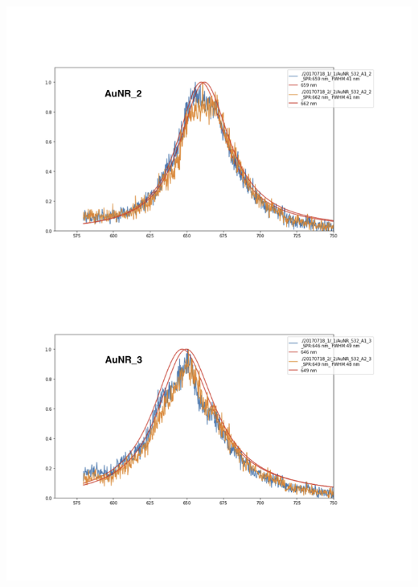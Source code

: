 \documentclass[twoside,single]{lion-msc}
\begin{document}
\begin{center}
\includegraphics[scale=.8]{7.png}
\end{center}
\end{document}
